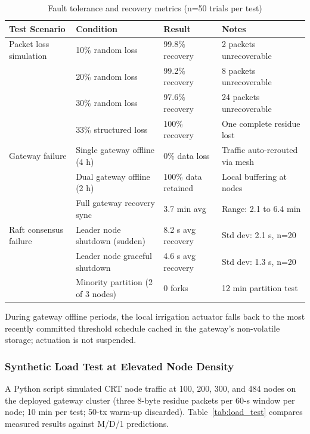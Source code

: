 \documentclass[pdflatex,sn-mathphys-num]{sn-jnl}
\theoremstyle{thmstyleone}
\theoremstyle{thmstyletwo}
\theoremstyle{thmstylethree}
\begin{document}
\begin{table}[htbp]
\centering
\caption{Fault tolerance and recovery metrics (n=50 trials per test)}
\label{tab:fault-tolerance}
\footnotesize
\setlength{\tabcolsep}{3pt}
\begin{tabular}{p{2.0cm}p{2.5cm}p{1.8cm}p{2.2cm}}
\toprule
\textbf{Test Scenario} & \textbf{Condition} & \textbf{Result} & \textbf{Notes} \\
\midrule
Packet loss simulation  & 10\% random loss   & 99.8\% recovery  & 2 packets unrecoverable \\
                        & 20\% random loss   & 99.2\% recovery  & 8 packets unrecoverable \\
                        & 30\% random loss   & 97.6\% recovery  & 24 packets unrecoverable \\
                        & 33\% structured loss & 100\% recovery & One complete residue lost \\
\midrule
Gateway failure         & Single gateway offline (4 h)   & 0\% data loss & Traffic auto-rerouted via mesh \\
                        & Dual gateway offline (2 h)      & 100\% data retained & Local buffering at nodes \\
                        & Full gateway recovery sync        & 3.7 min avg & Range: 2.1 to 6.4 min \\
\midrule
Raft consensus failure  & Leader node shutdown (sudden)    & 8.2 s avg recovery & Std dev: 2.1 s, n=20 \\
                        & Leader node graceful shutdown    & 4.6 s avg recovery & Std dev: 1.3 s, n=20 \\
                        & Minority partition (2 of 3 nodes) & 0 forks & 12 min partition test \\
\bottomrule
\end{tabular}
\end{table}

During gateway offline periods, the local irrigation actuator falls back to the most recently committed threshold schedule cached in the gateway's non-volatile storage; actuation is not suspended.

\subsubsection{Synthetic Load Test at Elevated Node Density}
\label{subsubsec:load_test}

A Python script simulated CRT node traffic at 100, 200, 300, and 484 nodes on the deployed gateway cluster (three 8-byte residue packets per 60-s window per node; 10 min per test; 50-tx warm-up discarded). Table~\ref{tab:load_test} compares measured results against M/D/1 predictions.
\end{document}
